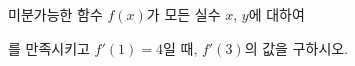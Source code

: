 미분가능한 함수 $f(x)$가 모든 실수 $x$, $y$에 대하여 \par\smallskip{}\par\smallskip\noindent 를 만족시키고 $f'(1)=4$일 때, $f'(3)$의 값을 구하시오.
